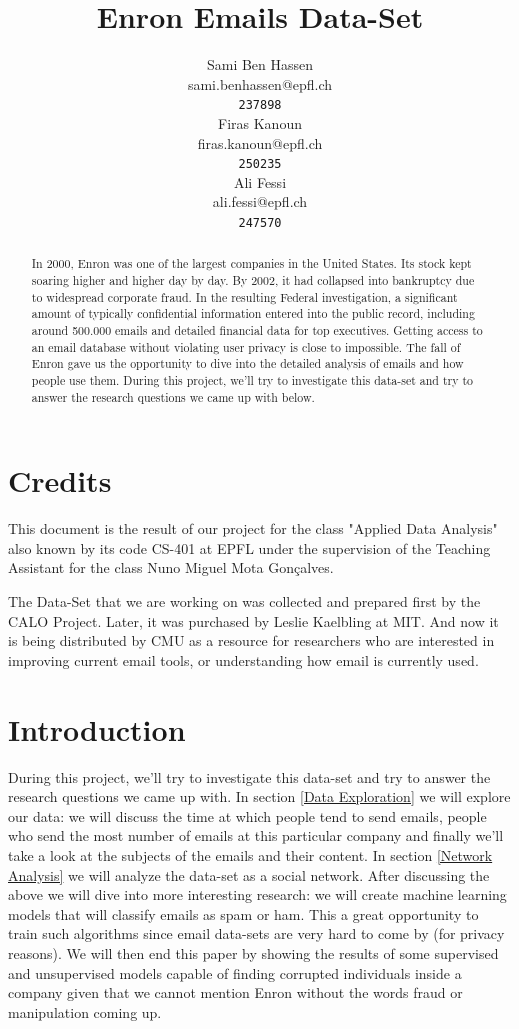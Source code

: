 \documentclass[11pt]{article}
\title{Enron Emails Data-Set}
\author{Sami Ben Hassen \\
  {sami.benhassen@epfl.ch\\\tt237898} \\\And
  Firas Kanoun \\
  {firas.kanoun@epfl.ch\\\tt250235} \\\And
Ali Fessi \\
{ali.fessi@epfl.ch\\\tt247570} \\}
\date{}
\begin{document}
\maketitle
\begin{abstract}
  In 2000, Enron\cite{ENRON} was one of the largest companies in the United States. Its stock kept soaring higher and higher day by day. By 2002, it had collapsed into bankruptcy due to widespread corporate fraud. In the resulting Federal investigation, a significant amount of typically confidential information entered into the public record, including around 500.000 emails and detailed financial data for top executives.
  Getting access to an email database without violating user privacy is close to impossible. The fall of Enron gave us the opportunity to dive into the detailed analysis of emails and how people use them.
  During this project, we'll try to investigate this data-set and try to answer the research questions we came up with below.
\end{abstract}

\section{Credits}

This document is the result of our project for the class "Applied Data Analysis" also known by its code CS-401 at EPFL under the supervision of the Teaching Assistant for the class Nuno Miguel Mota Gon\c{c}alves.

The Data-Set that we are working on was collected and prepared first by the CALO Project\cite{CALO}. Later, it was purchased by Leslie Kaelbling\cite{Leslie} at MIT. And now it is being distributed by CMU\cite{CMU} as a resource for researchers who are interested in improving current email tools, or understanding how email is currently used.

\section{Introduction}

During this project, we'll try to investigate this data-set and try to answer the research questions we came up with.
In section \ref{Data Exploration} we will explore our data: we will discuss the time at which people tend to send emails, people who send the most number of emails at this particular company and finally we'll take a look at the subjects of the emails and their content. In section \ref{Network Analysis} we will analyze the data-set as a social network. After discussing the above we will dive into more interesting research: we will create machine learning models that will classify emails as spam or ham. This a great opportunity to train such algorithms since email data-sets are very hard to come by (for privacy reasons). We will then end this paper by showing the results of some supervised and unsupervised models capable of finding corrupted individuals inside a company given that we cannot mention Enron without the words fraud or manipulation coming up.
\end{document}
